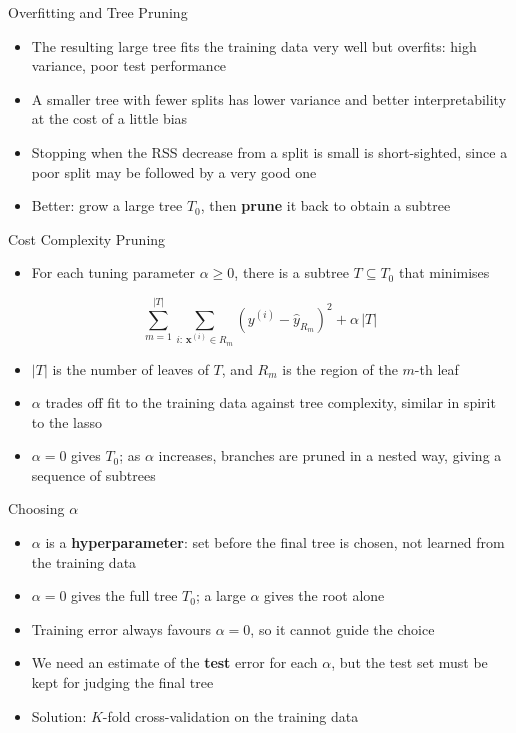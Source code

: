 \begin{frame}{Overfitting and Tree Pruning}
    \begin{itemize}
        \item The resulting large tree fits the training data very well but overfits: high variance, poor test performance
        \item A smaller tree with fewer splits has lower variance and better interpretability at the cost of a little bias
        \item Stopping when the RSS decrease from a split is small is short-sighted, since a poor split may be followed by a very good one
        \item Better: grow a large tree $T_0$, then \textbf{prune} it back to obtain a subtree
    \end{itemize}
\end{frame}


\begin{frame}{Cost Complexity Pruning}
    \begin{itemize}
        \item For each tuning parameter $\alpha \ge 0$, there is a subtree $T \subseteq T_0$ that minimises
    \end{itemize}
    \[
        \sum_{m=1}^{|T|} \sum_{i:\, \mathbf{x}^{(i)} \in R_m} \left( y^{(i)} - \hat{y}_{R_m} \right)^2 + \alpha\, |T|
    \]
    \begin{itemize}
        \item $|T|$ is the number of leaves of $T$, and $R_m$ is the region of the $m$-th leaf
        \item $\alpha$ trades off fit to the training data against tree complexity, similar in spirit to the lasso
        \item $\alpha = 0$ gives $T_0$; as $\alpha$ increases, branches are pruned in a nested way, giving a sequence of subtrees
    \end{itemize}
\end{frame}


\begin{frame}{Choosing $\alpha$}
    \begin{itemize}
        \item $\alpha$ is a \textbf{hyperparameter}: set before the final tree is chosen, not learned from the training data
        \item $\alpha = 0$ gives the full tree $T_0$; a large $\alpha$ gives the root alone
        \item Training error always favours $\alpha = 0$, so it cannot guide the choice
        \item We need an estimate of the \textbf{test} error for each $\alpha$, but the test set must be kept for judging the final tree
        \item Solution: $K$-fold cross-validation on the training data
    \end{itemize}
\end{frame}


